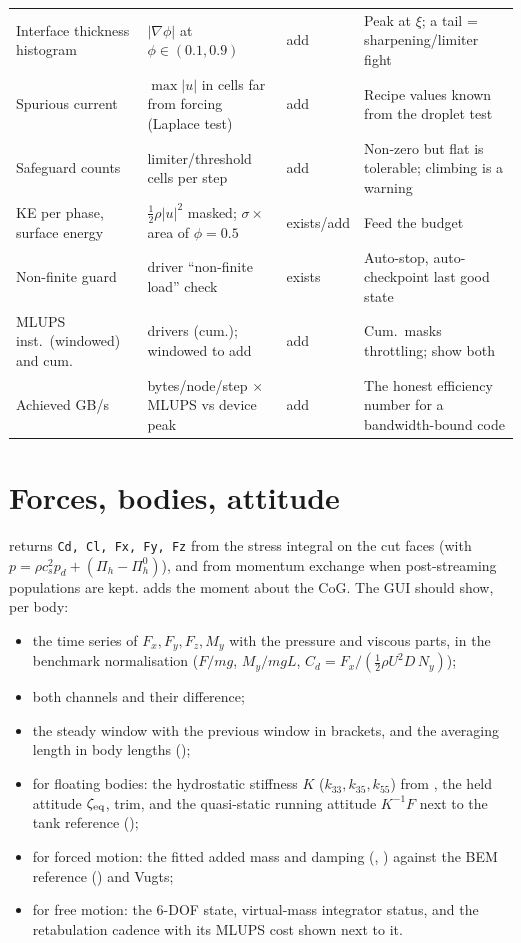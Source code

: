 \documentclass[11pt,a4paper]{article}
\newcommand{\cs}{c_s}
\newcommand{\pd}{p_d}
\newcommand{\Pih}{\Pi_h}
\newcommand{\code}[1]{\texttt{#1}}
\newcommand{\have}{\textcolor{green!45!black}{exists}}
\newcommand{\addme}{\textcolor{orange!80!black}{add}}
\begin{document}
\begin{longtable}{L{3.4cm}L{4.6cm}L{1.4cm}L{5.3cm}}
Interface thickness histogram & $|\nabla\phi|$ at $\phi\in(0.1,0.9)$ & \addme & Peak at $\xi$; a tail = sharpening/limiter fight \\
Spurious current & $\max|u|$ in cells far from forcing (Laplace test) & \addme & Recipe values known from the droplet test \\
Safeguard counts & limiter/threshold cells per step & \addme & Non-zero but flat is tolerable; climbing is a warning \\
KE per phase, surface energy & $\tfrac12\rho|u|^2$ masked; $\sigma\times$ area of $\phi=0.5$ & \have/\addme & Feed the budget \\
Non-finite guard & driver ``non-finite load'' check & \have & Auto-stop, auto-checkpoint last good state \\
MLUPS inst.\ (windowed) and cum. & drivers (cum.); windowed to add & \addme & Cum.\ masks throttling; show both \\
Achieved GB/s & bytes/node/step $\times$ MLUPS vs device peak & \addme & The honest efficiency number for a bandwidth-bound code \\
\bottomrule
\end{longtable}

\section{Forces, bodies, attitude}\label{sec:forces}
 returns \code{Cd, Cl, Fx, Fy, Fz} from the stress
integral on the cut faces (with $p = \rho\cs^2\pd + (\Pih-\Pih^0)$), and
 from momentum exchange when post-streaming populations are kept.
 adds the moment about the CoG.
The GUI should show, per body:
\begin{itemize}
\item the time series of $F_x,F_y,F_z,M_y$ with the pressure and viscous parts, in the
  benchmark normalisation ($F/mg$, $M_y/mgL$, $C_d=F_x/(\tfrac12\rho U^2 D\,N_y)$);
\item both channels and their difference;
\item the steady window with the previous window in brackets, and the averaging
  length in body lengths ();
\item for floating bodies: the hydrostatic stiffness $K$ ($k_{33},k_{35},k_{55}$) from
  , the held attitude $\zeta_{\rm eq}$, trim, and the
  quasi-static running attitude $K^{-1}F$ next to the tank reference
  ();
\item for forced motion: the fitted added mass and damping (,
  ) against the BEM reference
  () and Vugts;
\item for free motion: the 6-DOF state, virtual-mass integrator status, and the
  retabulation cadence with its MLUPS cost shown next to it.
\end{itemize}
\end{document}
